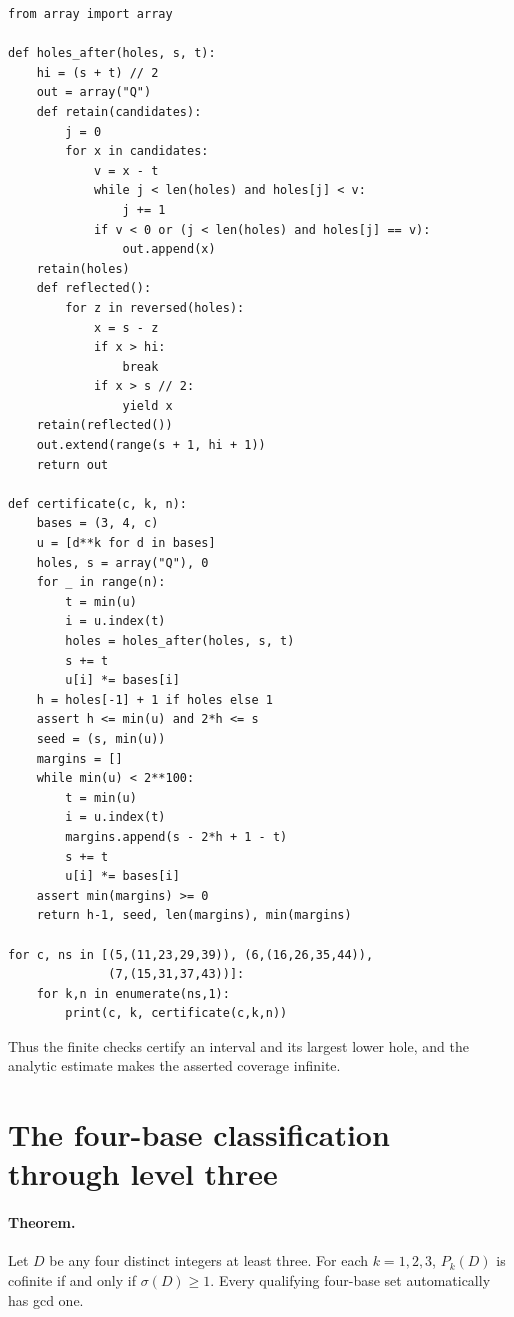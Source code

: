 \documentclass[11pt]{article}
\begin{document}
{\small\begin{verbatim}
from array import array

def holes_after(holes, s, t):
    hi = (s + t) // 2
    out = array("Q")
    def retain(candidates):
        j = 0
        for x in candidates:
            v = x - t
            while j < len(holes) and holes[j] < v:
                j += 1
            if v < 0 or (j < len(holes) and holes[j] == v):
                out.append(x)
    retain(holes)
    def reflected():
        for z in reversed(holes):
            x = s - z
            if x > hi:
                break
            if x > s // 2:
                yield x
    retain(reflected())
    out.extend(range(s + 1, hi + 1))
    return out

def certificate(c, k, n):
    bases = (3, 4, c)
    u = [d**k for d in bases]
    holes, s = array("Q"), 0
    for _ in range(n):
        t = min(u)
        i = u.index(t)
        holes = holes_after(holes, s, t)
        s += t
        u[i] *= bases[i]
    h = holes[-1] + 1 if holes else 1
    assert h <= min(u) and 2*h <= s
    seed = (s, min(u))
    margins = []
    while min(u) < 2**100:
        t = min(u)
        i = u.index(t)
        margins.append(s - 2*h + 1 - t)
        s += t
        u[i] *= bases[i]
    assert min(margins) >= 0
    return h-1, seed, len(margins), min(margins)

for c, ns in [(5,(11,23,29,39)), (6,(16,26,35,44)),
              (7,(15,31,37,43))]:
    for k,n in enumerate(ns,1):
        print(c, k, certificate(c,k,n))
\end{verbatim}}

Thus the finite checks certify an interval and its largest lower hole,
and the analytic estimate makes the asserted coverage infinite.



\section{The four-base classification through level three}

\paragraph{Theorem.}
Let $D$ be any four distinct integers at least three. For each
$k=1,2,3$, $P_k(D)$ is cofinite if and only if $\sigma(D)\ge1$.
Every qualifying four-base set automatically has gcd one.
\end{document}
